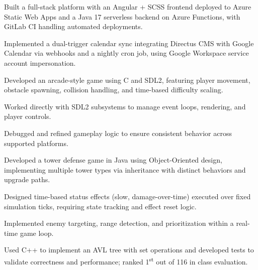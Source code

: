 \documentclass[letterpaper,10pt]{article}
\begin{document}
\begin{resume_list}
\item Built a full-stack platform with an Angular + SCSS frontend deployed to Azure Static Web Apps and a Java 17 serverless backend on Azure Functions, with GitLab CI handling automated deployments.
\item Implemented a dual-trigger calendar sync integrating Directus CMS with Google Calendar via webhooks and a nightly cron job, using Google Workspace service account impersonation.
\end{resume_list}

\begin{resume_list}
\item Developed an arcade-style game using C and SDL2, featuring player movement, obstacle spawning, collision handling, and time-based difficulty scaling.
\item Worked directly with SDL2 subsystems to manage event loops, rendering, and player controls.
\item Debugged and refined gameplay logic to ensure consistent behavior across supported platforms.
\end{resume_list}

\begin{resume_list}
\item Developed a tower defense game in Java using Object-Oriented design, implementing multiple tower types via inheritance with distinct behaviors and upgrade paths.
\item Designed time-based status effects (slow, damage-over-time) executed over fixed simulation ticks, requiring state tracking and effect reset logic.
\item Implemented enemy targeting, range detection, and prioritization within a real-time game loop.
\end{resume_list}

\begin{resume_list}
\item Used C++ to implement an AVL tree with set operations and developed tests to validate correctness and performance; ranked 1\textsuperscript{st} out of 116 in class evaluation.
\end{resume_list}
\end{document}
